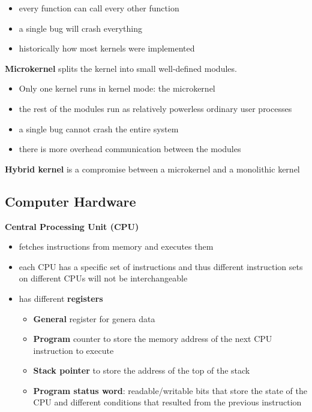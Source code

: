 \documentclass{article}
\newcommand{\bold}[1]{\textbf{#1}}
\begin{document}
    \begin{itemize}
    \item every function can call every other function
    \item a single bug will crash everything
    \item historically how most kernels were implemented
    \end{itemize}

    \noindent \textbf{Microkernel} splits the kernel into small well-defined modules. 


    \begin{itemize}
    \item Only one kernel runs in kernel mode: the microkernel
    \item the rest of the modules run as relatively powerless ordinary user processes
    \item a single bug cannot crash the entire system
    \item there is more overhead communication between the modules
    \end{itemize}

    \noindent \textbf{Hybrid kernel} is a compromise between a microkernel and a monolithic kernel

\subsection{Computer Hardware}

    \textbf{Central Processing Unit (CPU)}

    \begin{itemize}
    \item fetches instructions from memory and executes them
    \item each CPU has a specific set of instructions and thus different instruction sets on different CPUs will not be interchangeable
    \item has different \textbf{registers}
    \begin{itemize}
        \item \bold{General} register for genera data
        \item \bold{Program} counter to store the memory address of the next CPU instruction to execute
        \item \bold{Stack pointer} to store the address of the top of the stack
        \item \bold{Program status word}: readable/writable bits that store the state of the CPU and different conditions that resulted from the previous instruction
    \end{itemize}
    \end{itemize}
\end{document}

